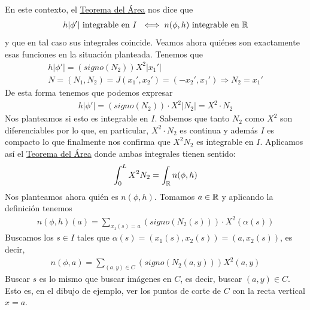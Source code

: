 En este contexto, el \hyperref[teo:area]{Teorema del Área} nos dice que 
\begin{gather*}
    h|\phi'| \text{ integrable en $I$ } \iff n(\phi, h) \text{ integrable en $\mathbb{R}$} 
\end{gather*}
y que en tal caso sus integrales coincide. Veamos ahora quiénes son exactamente esas funciones en la situación planteada. Tenemos que 
\begin{gather*}
    h|\phi'| = (signo(N_2))X^2|x_1'|\\[1.25em]
    N = (N_1, N_2) = J(x_1', x_2') = (-x_2', x_1') \Rightarrow N_2 = x_1'
\end{gather*}
De esta forma tenemos que podemos expresar
\begin{gather*}
    h|\phi'| = (signo(N_2)) \cdot X^2 |N_2| = X^2\cdot N_2
\end{gather*}
Nos planteamos si esto es integrable en $I$. Sabemos que tanto $N_2$ como $X^2$ son diferenciables por lo que, en particular, $X^2 \cdot N_2$ es continua y además $I$ es compacto lo que finalmente nos confirma que $X^2 N_2$ es integrable en $I$. Aplicamos así el \hyperref[teo:area]{Teorema del Área} donde ambas integrales tienen sentido:
\begin{gather*}
    \int_0^L X^2N_2 = \int_{\mathbb{R}} n(\phi, h)
\end{gather*}
Nos planteamos ahora quién es $n(\phi, h)$. Tomamos $a\in \mathbb{R}$ y aplicando la definición tenemos
\begin{gather*}
    n(\phi, h)(a) = \sum_{x_1(s)=a} (signo(N_2(s)))\cdot X^2(\alpha(s))
\end{gather*}
Buscamos los $s\in I$ tales que $\alpha(s)=(x_1(s), x_2(s)) = (a, x_2(s))$, es decir,
\begin{gather*}
    n(\phi, a) = \sum_{(a,y)\in C}(signo(N_2(a,y)))X^2(a,y)
\end{gather*}
Buscar $s$ es lo mismo que buscar imágenes en $C$, es decir, buscar $(a,y)\in C$. Esto es, en el dibujo de ejemplo, ver los puntos de corte de $C$ con la recta vertical $x=a$.

